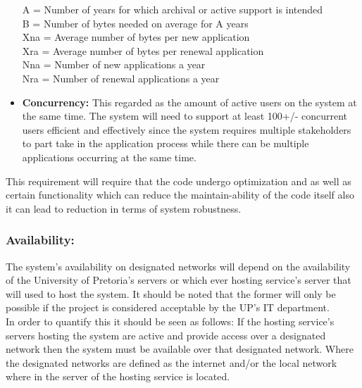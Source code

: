 \begin{flushleft}
\begin{itemize}
A = Number of years for which archival or active support is intended\\
B = Number of bytes needed on average for A years\\
Xna = Average number of bytes per new application\\
Xra = Average number of bytes per renewal application\\
Nna = Number of new applications a year\\
Nra = Number of renewal applications a year\\

\item\textbf{Concurrency:} This regarded as the amount of active users on the system at the same time.
The system will need to support at least 100+/- concurrent users efficient and effectively since the system requires multiple stakeholders to part take in the application process while there can be multiple applications occurring at the same time.\\

\end{itemize}

This requirement will require that the code undergo optimization and as well as certain functionality which can reduce the maintain-ability of the code itself also it can lead to reduction in terms of system robustness.

\end{flushleft}
\vspace{0.1in}

\subsubsection{Availability:}

\begin{flushleft}

The system's availability on designated networks will depend on the availability of the University of Pretoria's servers or which ever hosting service's server that will used to host the system. It should be noted that the former will only be possible if the project is considered acceptable by the UP's IT department.\\
In order to quantify this it should be seen as follows: If the hosting service's servers hosting the system are active and provide access over a designated network then the system must be available over that designated network. Where the designated networks are defined as the internet and/or the local network where in the server of the hosting service is located.

\end{flushleft}
\newpage
